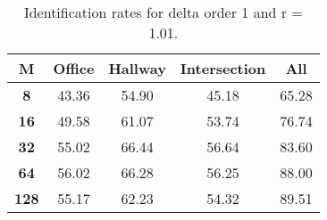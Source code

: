 \begin{table}[h]
    \small
    \centering
    \begin{tabular}{|c|c|c|c|l|}    
    \hline
    {\bf M} & {\bf Office} & {\bf Hallway} & {\bf Intersection} &     \multicolumn{1}{c|}{{\bf All}} \\ \hline
    {\bf 8} & 43.36 & 54.90 & 45.18 & 65.28 \\ \hline
    {\bf 16} & 49.58 & 61.07 & 53.74 & 76.74 \\ \hline
    {\bf 32} & 55.02 & 66.44 & 56.64 & 83.60 \\ \hline
    {\bf 64} & 56.02 & 66.28 & 56.25 & 88.00 \\ \hline
    {\bf 128} & 55.17 & 62.23 & 54.32 & 89.51 \\ \hline
    \end{tabular}
    \caption{Identification rates for delta order 1 and r = 1.01.}    
    \label{tab:identify_speakers_1.01_mit_19_1}
\end{table}
